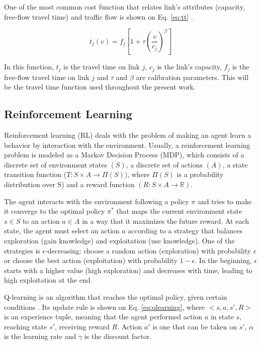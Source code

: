 \documentclass[12pt]{llncs}
\newcommand{\travTime}{\ensuremath{t_j}} 	%
\newcommand{\fftt}{\ensuremath{f_j}} 		%
\newcommand{\linkCap}{\ensuremath{c_j}}		%
\newcommand{\veh}{\ensuremath{v}}		%
\begin{document}
One of the most common cost function that relates link's attributes (capacity, free-flow travel time) and traffic flow is shown on Eq. \eqref{eq:tt} \cite{Ortuzar&Willumsen2001}.

\begin{equation}
\label{eq:tt}
\travTime(\veh) = \fftt[1 + \tau \left(\frac{\veh}{\linkCap}\right)^\beta]
\end{equation}

In this function, $\travTime$ is the travel time on link $j$, $\linkCap$ is the link's capacity, $\fftt$ is the free-flow travel time on link $j$ and $\tau$ and $\beta$ are calibration parameters. This will be the travel time function used throughout the present work.

\subsection{Reinforcement Learning}

Reinforcement learning (RL) deals with the problem of making an agent learn a behavior by interaction with the environment. Usually, a reinforcement learning problem is modeled as a Markov Decision Process (MDP), which consists of a discrete set of environment states $(S)$, a discrete set of actions $(A)$, a state transition function ($T: S \times A \to \Pi(S))$, where $\Pi(S)$ is a probability distribution over S) and a reward function $(R: S \times A \to \mathbb{R})$. %

The agent interacts with the environment following a policy $\pi$ and tries to make it converge to the optimal policy $\pi^*$ that maps the current environment state $s \in S$ to an action $a \in A$ in a way that it maximizes the future reward. At each state, the agent must select an action $a$ according to a strategy that balances exploration (gain knowledge) and exploitation (use knowledge). One of the strategies is $\epsilon$-decreasing: choose a random action (exploration) with probability $\epsilon$ or choose the best action (exploitation) with probability $1 - \epsilon$. In the beginning, $\epsilon$ starts with a higher value (high exploration) and decreases with time, leading to high exploitation at the end.

Q-learning is an algorithm that reaches the optimal policy, given certain conditions \cite{Kaelbling+1996}. Its update rule is shown on Eq. \eqref{eq:qlearning}, where \linebreak$<s,a,s',R>$ is an experience tuple, meaning that the agent performed action $a$ in state $s$, reaching state $s'$, receiving reward $R$. Action $a'$ is one that can be taken on $s'$, $\alpha$ is the learning rate and $\gamma$ is the discount factor.
\end{document}
